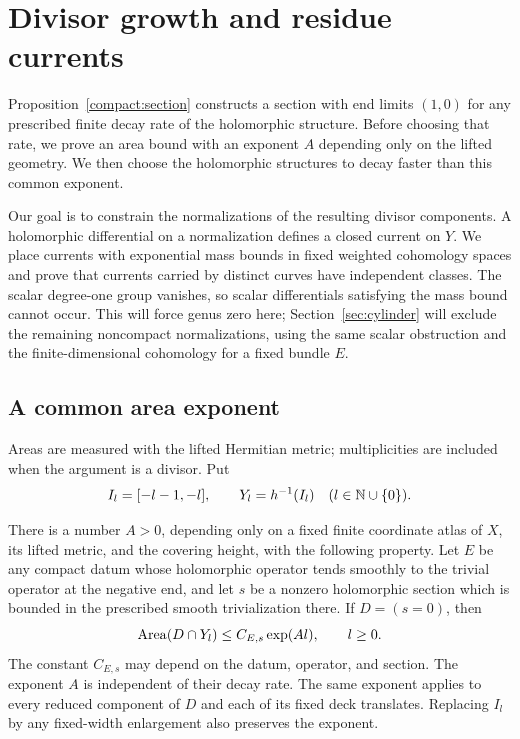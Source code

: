 \section{Divisor growth and residue currents}\label{sec:curves}

Proposition~\ref{compact:section} constructs a section with end limits
$(1,0)$ for any prescribed finite decay rate of the holomorphic
structure. Before choosing that rate, we prove an area bound with an
exponent $A$ depending only on the lifted geometry. We then choose the
holomorphic structures to decay faster than this common exponent.

Our goal is to constrain the normalizations of the resulting divisor
components. A holomorphic differential on a normalization defines a
closed current on $Y$. We place currents with exponential mass bounds
in fixed weighted cohomology spaces and prove that currents carried by
distinct curves have independent classes. The scalar degree-one group vanishes,
so scalar differentials satisfying the mass bound cannot occur. This
will force genus zero here; Section~\ref{sec:cylinder} will exclude the
remaining noncompact normalizations, using the same scalar obstruction
and the finite-dimensional cohomology for a fixed bundle $E$.

\subsection{A common area exponent}

Areas are measured with the lifted Hermitian metric; multiplicities
are included when the argument is a divisor. Put
\[
 I_l=[-l-1,-l],\qquad Y_l=h^{-1}(I_l)\quad(l\in\mathbb N\cup\{0\}).
\]

\begin{lemma}\label{curve:area}
There is a number $A>0$, depending only on a fixed finite coordinate
atlas of $X$, its lifted metric, and the covering height, with the following
property.  Let $E$ be any compact datum whose holomorphic operator tends
smoothly to the trivial operator at the negative end, and let $s$ be a
nonzero holomorphic section which is bounded in the prescribed smooth
trivialization there.  If $D=(s=0)$, then
\begin{equation}\label{curve:area-bound}
 \operatorname{Area}(D\cap Y_l)\le C_{E,s}\exp(Al),\qquad l\ge0.
\end{equation}
The constant $C_{E,s}$ may depend on the datum, operator, and section.
The exponent $A$ is independent of their decay rate.  The same exponent
applies to every reduced component of $D$ and each of its fixed deck
translates.  Replacing $I_l$ by any fixed-width enlargement also preserves
the exponent.
\end{lemma}

